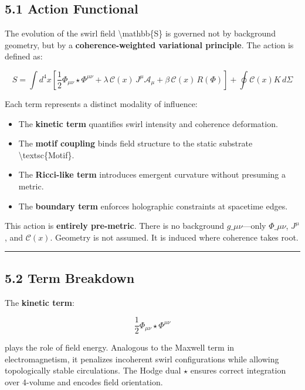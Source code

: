 \documentclass[
  11pt,
]{article}
\providecommand{\tightlist}{%
  \setlength{\itemsep}{0pt}\setlength{\parskip}{0pt}}
\begin{document}
\subsection{5.1 Action Functional}\label{action-functional}

The evolution of the swirl field \textbackslash mathbb\{S\} is governed
not by background geometry, but by a \textbf{coherence-weighted
variational principle}. The action is defined as:

\[
S = \int d^4x \left[ \frac{1}{2} \Phi_{\mu\nu} \star \Phi^{\mu\nu} + \lambda\, \mathcal{C}(x)\, J^\mu \mathcal{A}_\mu + \beta\, \mathcal{C}(x)\, R(\Phi) \right] + \oint \mathcal{C}(x) K\, d\Sigma
\]

Each term represents a distinct modality of influence:

\begin{itemize}
\tightlist
\item
  The \textbf{kinetic term} quantifies swirl intensity and coherence
  deformation.
\item
  The \textbf{motif coupling} binds field structure to the static
  substrate \textbackslash textsc\{Motif\}.
\item
  The \textbf{Ricci-like term} introduces emergent curvature without
  presuming a metric.
\item
  The \textbf{boundary term} enforces holographic constraints at
  spacetime edges.
\end{itemize}

This action is \textbf{entirely pre-metric}. There is no background
\(g\_{\mu\nu}\)---only \(\Phi\_{\mu\nu}\), \(J^\mu\), and
\(\mathcal{C}(x)\). Geometry is not assumed. It is induced where
coherence takes root.

\begin{center}\rule{0.5\linewidth}{0.5pt}\end{center}

\subsection{5.2 Term Breakdown}\label{term-breakdown}

The \textbf{kinetic term}:

\[
\frac{1}{2} \Phi_{\mu\nu} \star \Phi^{\mu\nu}
\]

plays the role of field energy. Analogous to the Maxwell term in
electromagnetism, it penalizes incoherent swirl configurations while
allowing topologically stable circulations. The Hodge dual \(\star\)
ensures correct integration over 4-volume and encodes field orientation.
\end{document}
